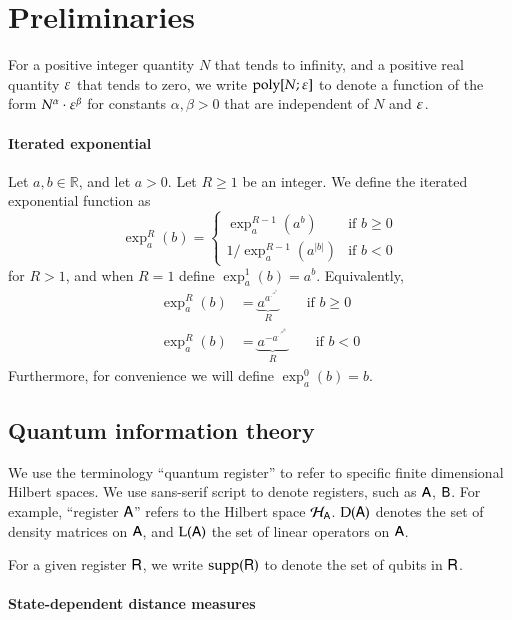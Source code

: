 

\section{Preliminaries}

For a positive integer quantity $N$ that tends to infinity, and a positive real quantity $\varepsilon$ that tends to zero, we write $\operatorname{poly}[N;\varepsilon]$ to denote a function of the form $N^\alpha \cdot \varepsilon^\beta$ for constants $\alpha, \beta > 0$ that are independent of $N$ and $\varepsilon$.

\paragraph{Iterated exponential}
Let $a,b \in \mathbb{R}$, and let $a > 0$. Let $R \geq 1$ be an integer. We define the iterated exponential function as
\[
	\exp^R_a(b) = 
	\left \{ \begin{array}{ll}
		\exp^{R-1}_a(a^b)	& \mbox{if } b \geq 0 \\
		1/\exp^{R-1}_a(a^{|b|}) & \mbox {if } b < 0
	\end{array}
	\right.
\]
for $R > 1$, and when $R=1$ define $\exp^1_a(b) = a^b$. Equivalently, 
\begin{align*}
	\exp^R_a(b) &= \underbrace{a^{a^{\cdot^{\cdot^{a^b}}}}}_{R} \qquad \mbox{if } b \geq 0 \\
	\exp^R_a(b) &= \underbrace{a^{-a^{\cdot^{\cdot^{a^{|b|}}}}}}_{R} \qquad \mbox{if } b < 0
\end{align*}
Furthermore, for convenience we will define $\exp^0_a(b) = b$.%

\subsection{Quantum information theory}

We use the terminology ``quantum register'' to refer to specific finite dimensional Hilbert spaces. We use sans-serif script to denote registers, such as ${\mathsf{A}}$, ${\mathsf{B}}$. For example, ``register ${\textsf{A}}$'' refers to the Hilbert space $\mathcal{H}_{{\textsf{A}}}$. 
$\mathrm{D}({\mathsf{A}})$ denotes the set of density matrices on ${\mathsf{A}}$, and $\mathrm{L}({\mathsf{A}})$ the set of linear operators on ${\mathsf{A}}$.

For a given register ${\mathsf{R}}$, we write $\operatorname{supp}({\mathsf{R}})$ to denote the set of qubits in ${\mathsf{R}}$.

\paragraph{State-dependent distance measures}

